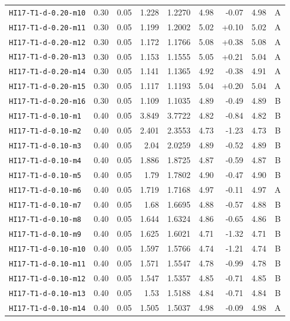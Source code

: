 \begin{longtable}{@{}lrrrrrrrc@{}}
\texttt{HI17-T1-d-0.20-m10} & 0.30 & 0.05 & 1.228 & 1.2270 & 4.98 & -0.07 & 4.98 & A\\
\texttt{HI17-T1-d-0.20-m11} & 0.30 & 0.05 & 1.199 & 1.2002 & 5.02 & +0.10 & 5.02 & A\\
\texttt{HI17-T1-d-0.20-m12} & 0.30 & 0.05 & 1.172 & 1.1766 & 5.08 & +0.38 & 5.08 & A\\
\texttt{HI17-T1-d-0.20-m13} & 0.30 & 0.05 & 1.153 & 1.1555 & 5.05 & +0.21 & 5.04 & A\\
\texttt{HI17-T1-d-0.20-m14} & 0.30 & 0.05 & 1.141 & 1.1365 & 4.92 & -0.38 & 4.91 & A\\
\texttt{HI17-T1-d-0.20-m15} & 0.30 & 0.05 & 1.117 & 1.1193 & 5.04 & +0.20 & 5.04 & A\\
\texttt{HI17-T1-d-0.20-m16} & 0.30 & 0.05 & 1.109 & 1.1035 & 4.89 & -0.49 & 4.89 & B\\
\texttt{HI17-T1-d-0.10-m1} & 0.40 & 0.05 & 3.849 & 3.7722 & 4.82 & -0.84 & 4.82 & B\\
\texttt{HI17-T1-d-0.10-m2} & 0.40 & 0.05 & 2.401 & 2.3553 & 4.73 & -1.23 & 4.73 & B\\
\texttt{HI17-T1-d-0.10-m3} & 0.40 & 0.05 & 2.04 & 2.0259 & 4.89 & -0.52 & 4.89 & B\\
\texttt{HI17-T1-d-0.10-m4} & 0.40 & 0.05 & 1.886 & 1.8725 & 4.87 & -0.59 & 4.87 & B\\
\texttt{HI17-T1-d-0.10-m5} & 0.40 & 0.05 & 1.79 & 1.7802 & 4.90 & -0.47 & 4.90 & B\\
\texttt{HI17-T1-d-0.10-m6} & 0.40 & 0.05 & 1.719 & 1.7168 & 4.97 & -0.11 & 4.97 & A\\
\texttt{HI17-T1-d-0.10-m7} & 0.40 & 0.05 & 1.68 & 1.6695 & 4.88 & -0.57 & 4.88 & B\\
\texttt{HI17-T1-d-0.10-m8} & 0.40 & 0.05 & 1.644 & 1.6324 & 4.86 & -0.65 & 4.86 & B\\
\texttt{HI17-T1-d-0.10-m9} & 0.40 & 0.05 & 1.625 & 1.6021 & 4.71 & -1.32 & 4.71 & B\\
\texttt{HI17-T1-d-0.10-m10} & 0.40 & 0.05 & 1.597 & 1.5766 & 4.74 & -1.21 & 4.74 & B\\
\texttt{HI17-T1-d-0.10-m11} & 0.40 & 0.05 & 1.571 & 1.5547 & 4.78 & -0.99 & 4.78 & B\\
\texttt{HI17-T1-d-0.10-m12} & 0.40 & 0.05 & 1.547 & 1.5357 & 4.85 & -0.71 & 4.85 & B\\
\texttt{HI17-T1-d-0.10-m13} & 0.40 & 0.05 & 1.53 & 1.5188 & 4.84 & -0.71 & 4.84 & B\\
\texttt{HI17-T1-d-0.10-m14} & 0.40 & 0.05 & 1.505 & 1.5037 & 4.98 & -0.09 & 4.98 & A\\

\end{longtable}

